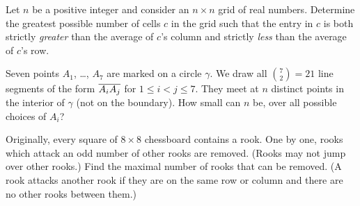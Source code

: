

\begin{problem}
Let $n$ be a positive integer and
consider an $n \times n$ grid of real numbers.
Determine the greatest possible number of cells $c$ in the grid such that
the entry in $c$ is both strictly \emph{greater} than the average of $c$'s column
and strictly \emph{less} than the average of $c$'s row.
\end{problem} 



\begin{problem}
Seven points $A_1$, \dots, $A_7$ are marked on a circle $\gamma$.
We draw all $\binom 72 = 21$ line segments
of the form $\overline{A_i A_j}$ for $1 \le i < j \le 7$.
They meet at $n$ distinct points in the interior of $\gamma$
(not on the boundary).
How small can $n$ be, over all possible choices of $A_i$?
\end{problem} 



\begin{problem}
Originally, every square of $8 \times 8$ chessboard contains a rook.
One by one, rooks which attack an odd number of other rooks are removed.
(Rooks may not jump over other rooks.)
Find the maximal number of rooks that can be removed.
(A rook attacks another rook if they are on the same row or column
and there are no other rooks between them.)
\end{problem} 



